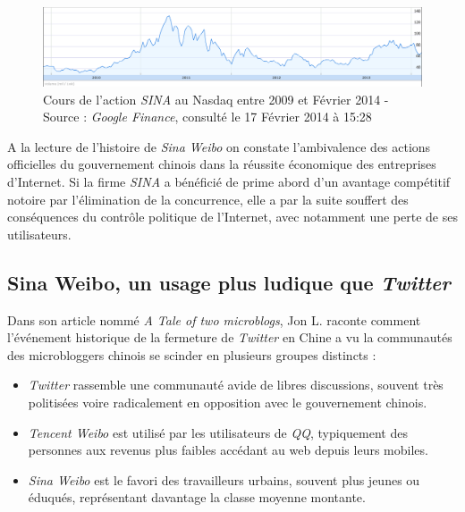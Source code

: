 \begin{figure}[htbp]
    \centering
    \includegraphics[scale=0.4]{figures/chap1/sina.png}
    \caption[Cours de l’action SINA au Nasdaq entre 2009 et Février 2014]{Cours de l’action \textit{SINA} au Nasdaq entre 2009 et Février 2014 - Source : \textit{Google Finance}, consulté le 17 Février 2014 à 15:28 }
    \label{fig:sina_nasdaq}
\end{figure}

A la lecture de l’histoire de \textit{Sina Weibo} on constate l’ambivalence des actions officielles du gouvernement chinois dans la réussite économique des entreprises d’Internet. Si la firme \textit{SINA} a bénéficié de prime abord d’un avantage compétitif notoire par l’élimination de la concurrence, elle a par la suite souffert des conséquences du contrôle politique de l’Internet, avec notamment une perte de ses utilisateurs.


\subsection[Sina Weibo, un usage plus ludique que \textit{Twitter} ]{Sina Weibo, un usage plus ludique que \textit{Twitter} }

Dans son article nommé \textit{A Tale of two microblogs}, Jon L. \cite{Sullivan2012} raconte comment l’événement historique de la fermeture de \textit{Twitter} en Chine a vu la communautés des microbloggers chinois se scinder en plusieurs groupes distincts : 

\begin{itemize}
\item \textit{Twitter} rassemble une communauté avide de libres discussions, souvent très politisées voire radicalement en opposition avec le gouvernement chinois.
\item \textit{Tencent Weibo} est utilisé par les utilisateurs de \textit{QQ}, typiquement des personnes aux revenus plus faibles accédant au web depuis leurs mobiles.
\item \textit{Sina Weibo} est le favori des travailleurs urbains, souvent plus jeunes ou éduqués, représentant davantage la classe moyenne montante.
\end{itemize}

